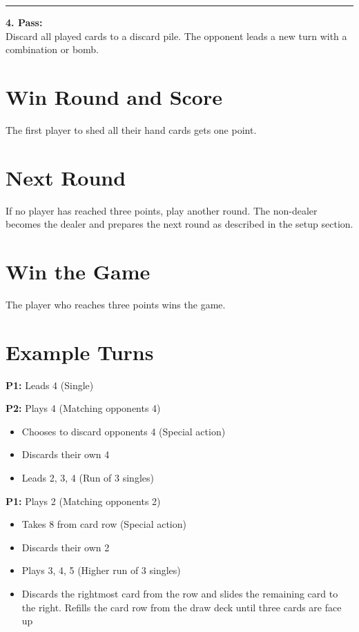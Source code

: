 \documentclass[11pt,a4paper]{article}
\begin{document}
\bigskip
\noindent\rule{0.3\columnwidth}{0.2pt}
\bigskip

\noindent\faHandPaper\quad \textbf{4. Pass:}\\[0.3em]
Discard all played cards to a discard pile. The opponent leads a new turn with a combination or bomb.

\section{Win Round and Score}

The first player to shed all their hand cards gets one point.

\section{Next Round}

If no player has reached three points, play another round. The non-dealer becomes the dealer and prepares the next round as described in the setup section.

\section{Win the Game}

The player who reaches three points wins the game.

\section{Example Turns}

\noindent\textbf{P1:} Leads 4 (Single)

\medskip
\noindent\textbf{P2:} Plays 4 (Matching opponents 4)
\begin{itemize}[nosep]
    \item Chooses to discard opponents 4 (Special action)
    \item Discards their own 4
    \item Leads 2, 3, 4 (Run of 3 singles)
\end{itemize}

\medskip
\noindent\textbf{P1:} Plays 2 (Matching opponents 2)
\begin{itemize}[nosep]
    \item Takes 8 from card row (Special action)
    \item Discards their own 2
    \item Plays 3, 4, 5 (Higher run of 3 singles)
    \item Discards the rightmost card from the row and slides the remaining card to the right. Refills the card row from the draw deck until three cards are face up
\end{itemize}
\end{document}
